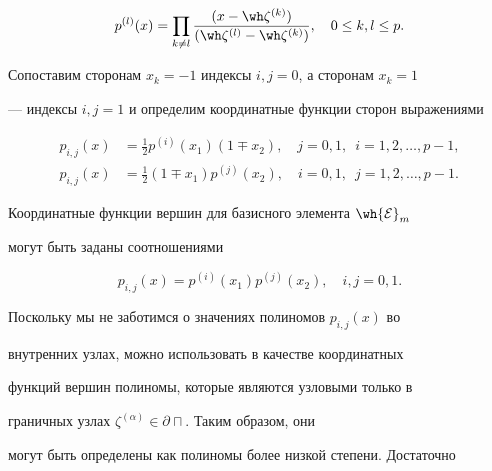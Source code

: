 

\begin{equation}\label{eq6.3}


p^{(l)}(x) = \prod_{k\ne l}


\frac{(x-\wh \zeta^{(k)})}{(\wh \zeta^{(l)} -


\wh \zeta^{(k)})}, \quad 0 \leq k,l \leq p.


\end{equation}


Сопоставим сторонам $x_k = -1$ индексы $i,j=0$, а сторонам $x_k=1$ 


--- индексы $i,j=1$ и определим координатные функции сторон выражениями


\begin{equation}


\begin{split}


\label{eq6.4}


p_{i,j}(x) & = \frac{1}{2} p^{(i)}(x_1)(1\mp x_2), \quad j=0,1,


\ \; i=1,2,\dotsc,p-1,\\


p_{i,j}(x) & = \frac{1}{2} (1\mp x_1)p^{(j)}(x_2), \quad i=0,1, \ \;


j=1,2,\dotsc,p-1.


\end{split}


\end{equation}


Координатные функции вершин для базисного элемента $\wh{{\cal E}}_m$ 


могут быть заданы соотношениями 


\begin{equation}\label{6.5}


p_{i,j}(x) = p^{(i)}(x_1) p^{(j)}(x_2), \quad i,j=0,1.


\end{equation}


Поскольку мы не заботимся о значениях полиномов $p_{i,j}(x)$ во 


внутренних узлах, можно использовать в качестве координатных 


функций вершин полиномы, которые являются узловыми только в 


граничных узлах $\zeta^{(\alpha)} \in \partial\sqcap$. Таким образом, они 


могут быть определены как полиномы более низкой степени. Достаточно 


